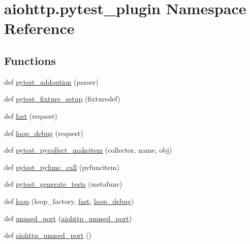 \hypertarget{namespaceaiohttp_1_1pytest__plugin}{}\section{aiohttp.\+pytest\+\_\+plugin Namespace Reference}
\label{namespaceaiohttp_1_1pytest__plugin}
\subsection*{Functions}
\begin{DoxyCompactItemize}
\item 
def \hyperlink{namespaceaiohttp_1_1pytest__plugin_ac0f752130583c16f198a79d395bc50f9}{pytest\+\_\+addoption} (parser)
\item 
def \hyperlink{namespaceaiohttp_1_1pytest__plugin_a772c55c24478647abee6bff8fee38523}{pytest\+\_\+fixture\+\_\+setup} (fixturedef)
\item 
def \hyperlink{namespaceaiohttp_1_1pytest__plugin_a6b6f4af436c3430865f0bbd0cc978202}{fast} (request)
\item 
def \hyperlink{namespaceaiohttp_1_1pytest__plugin_a557e64d4b425eaca246cb556d5704850}{loop\+\_\+debug} (request)
\item 
def \hyperlink{namespaceaiohttp_1_1pytest__plugin_a800342aec70a184eb31b6618ef05acfe}{pytest\+\_\+pycollect\+\_\+makeitem} (collector, name, obj)
\item 
def \hyperlink{namespaceaiohttp_1_1pytest__plugin_af300895004fd19b88e2b19b698bf48b7}{pytest\+\_\+pyfunc\+\_\+call} (pyfuncitem)
\item 
def \hyperlink{namespaceaiohttp_1_1pytest__plugin_ad1b66bb6280942fd5e8e43aa3cfc2a80}{pytest\+\_\+generate\+\_\+tests} (metafunc)
\item 
def \hyperlink{namespaceaiohttp_1_1pytest__plugin_a3666e22bceb1b3c3e28c97b5346cb61e}{loop} (loop\+\_\+factory, \hyperlink{namespaceaiohttp_1_1pytest__plugin_a6b6f4af436c3430865f0bbd0cc978202}{fast}, \hyperlink{namespaceaiohttp_1_1pytest__plugin_a557e64d4b425eaca246cb556d5704850}{loop\+\_\+debug})
\item 
def \hyperlink{namespaceaiohttp_1_1pytest__plugin_a5d594e7375606d5a5c545f0fed0fa73f}{unused\+\_\+port} (\hyperlink{namespaceaiohttp_1_1pytest__plugin_adb00ddc12b0a3439fbc706acc6c00291}{aiohttp\+\_\+unused\+\_\+port})
\item 
def \hyperlink{namespaceaiohttp_1_1pytest__plugin_adb00ddc12b0a3439fbc706acc6c00291}{aiohttp\+\_\+unused\+\_\+port} ()
\item 

\end{DoxyCompactItemize}
